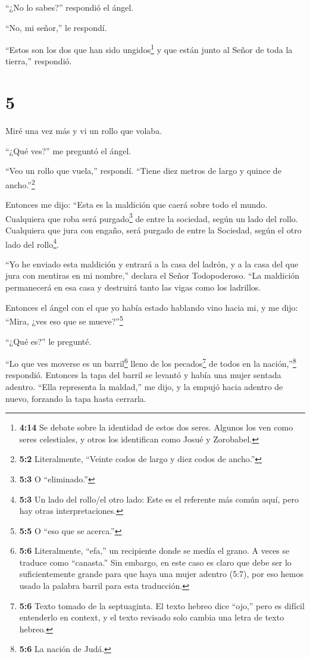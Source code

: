  ``¿No lo sabes?'' respondió el ángel.

``No, mi señor,'' le respondí.

 ``Estos son los dos que han sido ungidos\footnote{\textbf{4:14}
  Se debate sobre la identidad de estos dos seres. Algunos los ven como
  seres celestiales, y otros los identifican como Josué y Zorobabel.} y
que están junto al Señor de toda la tierra,'' respondió.

\hypertarget{section-4}{%
\section{5}\label{section-4}}

 Miré una vez más y vi un rollo que volaba.

 ``¿Qué ves?'' me preguntó el ángel.

``Veo un rollo que vuela,'' respondí. ``Tiene diez metros de largo y
quince de ancho.''\footnote{\textbf{5:2} Literalmente, ``Veinte codos de
  largo y diez codos de ancho.''}

 Entonces me dijo: ``Esta es la maldición que caerá sobre
todo el mundo. Cualquiera que roba será purgado\footnote{\textbf{5:3} O
  ``eliminado.''} de entre la sociedad, según un lado del rollo.
Cualquiera que jura con engaño, será purgado de entre la Sociedad, según
el otro lado del rollo\footnote{\textbf{5:3} Un lado del rollo/el otro
  lado: Este es el referente más común aquí, pero hay otras
  interpretaciones.}.

 ``Yo he enviado esta maldición y entrará a la casa del
ladrón, y a la casa del que jura con mentiras en mi nombre,'' declara el
Señor Todopoderoso. ``La maldición permanecerá en esa casa y destruirá
tanto las vigas como los ladrillos.

 Entonces el ángel con el que yo había estado hablando vino
hacia mi, y me dijo: ``Mira, ¿ves eso que se mueve?''\footnote{\textbf{5:5}
  O ``eso que se acerca.''}

 ``¿Qué es?'' le pregunté.

``Lo que ves moverse es un barril\footnote{\textbf{5:6} Literalmente,
  ``efa,'' un recipiente donde se medía el grano. A veces se traduce
  como ``canasta.'' Sin embargo, en este caso es claro que debe ser lo
  suficientemente grande para que haya una mujer adentro (5:7), por eso
  hemos usado la palabra barril para esta traducción.} lleno de los
pecados\footnote{\textbf{5:6} Texto tomado de la septuaginta. El texto
  hebreo dice ``ojo,'' pero es difícil entenderlo en context, y el texto
  revisado solo cambia una letra de texto hebreo.} de todos en la
nación,''\footnote{\textbf{5:6} La nación de Judá.} respondió.
 Entonces la tapa del barril se levantó y había una mujer
sentada adentro.  ``Ella representa la maldad,'' me dijo, y
la empujó hacia adentro de nuevo, forzando la tapa hasta cerrarla.

